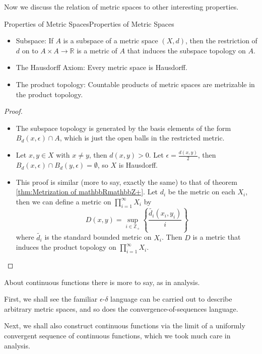 \documentclass[../main.tex]{subfiles}
\begin{document}
Now we discuss the relation of metric spaces to other interesting properties.
\begin{proposition}{Properties of Metric Spaces}{Properties of Metric Spaces}
\begin{itemize}
\item Subspace: If $A$ is a subspace of a metric space $(X,d)$, then the restriction of $d$ on to $A \times A \rightarrow \mathbb{R}$ is a metric of $A$ that induces the subspace topology on $A$.
\item The Hausdorff Axiom: Every metric space is Hausdorff.
\item The product topology: Countable products of metric spaces are metrizable in the product topology.
\end{itemize}
\end{proposition}
\begin{proof}
\begin{itemize}
\item The subspace topology is generated by the basis elements of the form $B_d(x,\epsilon) \cap A$, which is just the open balls in the restricted metric.
\item Let $x,y\in X$ with $x\neq y$, then $d(x,y)>0$. Let $\epsilon = \frac{d(x,y)}{2}$, then $B_d(x,\epsilon) \cap B_d(y,\epsilon) = \emptyset$, so $X$ is Hausdorff.
\item This proof is similar (more to say, exactly the same) to that of theorem \ref{thm:Metrization of mathbbRmathbbZ+}. Let $d_i$ be the metric on each $X_{i}$, then we can define a metric on $\prod_{i=1}^{\infty } X_i$ by
\begin{equation*}
D(x,y) = \sup_{i\in \mathbb{Z}_+} \left\{ \frac{\tilde{d_i}(x_i,y_i)}{i} \right\}
\end{equation*}
where $\tilde{d_i}$ is the standard bounded metric on $X_i$. Then $D$ is a metric that induces the product topology on $\prod_{i=1}^{\infty } X_i$.
\end{itemize}
\end{proof}

About continuous functions there is more to say, as in analysis.

First, we shall see the familiar $\epsilon$-$\delta$ language can be carried out to describe arbitrary metric spaces, and so does the convergence-of-sequences language.

Next, we shall also construct continuous functions via the limit of a uniformly convergent sequence of continuous functions, which we took much care in analysis.
\end{document}
